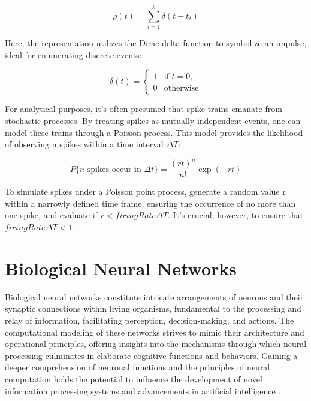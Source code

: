 \documentclass[12pt,a4paper]{report}
\begin{document}
\begin{equation}
    \rho(t) = \sum_{i=1}^{k} \delta(t-t_i)
\end{equation}

Here, the representation utilizes the Dirac delta function to symbolize an impulse, ideal for enumerating discrete events:

\begin{equation}
    \delta(t) = \begin{cases} 1 & \text{if } t = 0, \\ 0 & \text{otherwise} \end{cases}
\end{equation}

For analytical purposes, it's often presumed that spike trains emanate from stochastic processes. By treating spikes as mutually independent events, one can model these trains through a Poisson process. This model provides the likelihood of observing n spikes within a time interval $\Delta T$:

\begin{equation}
    P\{n \text{ spikes occur in } \Delta t\} = \frac{(rt)^n}{n!} \exp(-rt)
\end{equation}

To simulate spikes under a Poisson point process, generate a random value r within a narrowly defined time frame, ensuring the occurrence of no more than one spike, and evaluate if $r < firingRate \Delta T$. It's crucial, however, to ensure that $firingRate\Delta T < 1$.

\section{Biological Neural Networks}
Biological neural networks constitute intricate arrangements of neurons and their synaptic connections within living organisms, fundamental to the processing and relay of information, facilitating perception, decision-making, and actions. The computational modeling of these networks strives to mimic their architecture and operational principles, offering insights into the mechanisms through which neural processing culminates in elaborate cognitive functions and behaviors. Gaining a deeper comprehension of neuronal functions and the principles of neural computation holds the potential to influence the development of novel information processing systems and advancements in artificial intelligence \cite{CurrentBiology}.
\end{document}
